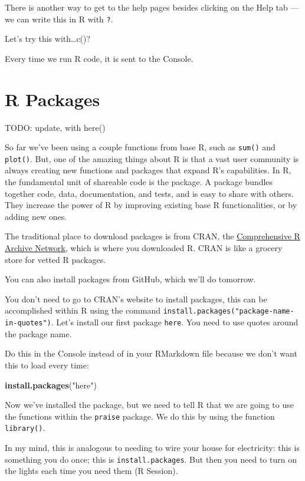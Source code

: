 \documentclass[]{book}
\newenvironment{Shaded}{\begin{snugshade}}{\end{snugshade}}
\newcommand{\KeywordTok}[1]{\textcolor[rgb]{0.13,0.29,0.53}{\textbf{#1}}}
\newcommand{\NormalTok}[1]{#1}
\newcommand{\StringTok}[1]{\textcolor[rgb]{0.31,0.60,0.02}{#1}}
\begin{document}
There is another way to get to the help pages besides clicking on the Help tab --- we can write this in R with \texttt{?}.

Let's try this with\ldots{}c()?

Every time we run R code, it is sent to the Console.

\hypertarget{r-packages}{%
\section{R Packages}\label{r-packages}}

TODO: update, with here()

So far we've been using a couple functions from base R, such as \texttt{sum()} and \texttt{plot()}. But, one of the amazing things about R is that a vast user community is always creating new functions and packages that expand R's capabilities. In R, the fundamental unit of shareable code is the package. A package bundles together code, data, documentation, and tests, and is easy to share with others. They increase the power of R by improving existing base R functionalities, or by adding new ones.

The traditional place to download packages is from CRAN, the \href{https://cran.r-project.org/}{Comprehensive R Archive Network}, which is where you downloaded R. CRAN is like a grocery store for vetted R packages.

You can also install packages from GitHub, which we'll do tomorrow.

You don't need to go to CRAN's website to install packages, this can be accomplished within R using the command \texttt{install.packages("package-name-in-quotes")}. Let's install our first package \texttt{here}. You need to use quotes around the package name.

Do this in the Console instead of in your RMarkdown file because we don't want this to load every time:

\begin{Shaded}
\begin{Highlighting}[]
\KeywordTok{install.packages}\NormalTok{(}\StringTok{"here"}\NormalTok{)}
\end{Highlighting}
\end{Shaded}

Now we've installed the package, but we need to tell R that we are going to use the functions within the \texttt{praise} package. We do this by using the function \texttt{library()}.

In my mind, this is analogous to needing to wire your house for electricity: this is something you do once; this is \texttt{install.packages}. But then you need to turn on the lights each time you need them (R Session).
\end{document}
